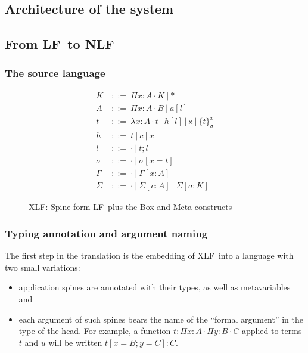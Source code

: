 \documentclass[preprint]{sigplanconf}
\newcommand\gor{\ |\ }
\newcommand\gequal{\ ::=\ }
\newcommand\meta[1]{\textsf{#1}}
\newcommand\mv{x}
\newcommand\mmv{y}
\newcommand\mmeta{\meta x}
\newcommand\mco{c}
\newcommand\mcf{a}
\newcommand\postbinder{\cdot}
\newcommand\prd[2]{\Pi{#1}:{#2}\postbinder}
\newcommand\tlam[2]{\lambda{#1}:{#2}\postbinder}
\newcommand\lam{\tlam}
\newcommand\obox[3]{\{{#1}\}^{#2}_{#3}}
\newcommand\srt[1]{\mathsf{#1}}
\newcommand\type{\srt *}
\newcommand\lapp[2]{{#1}[{#2}]}
\newcommand\laapp[3]{{#1}[{#2}]:{#3}}
\newcommand\lnil{\cdot}
\newcommand\lcons[2]{{#1};{#2}}
\newcommand\lncons[3]{{#1}={#2};{#3}}
\newcommand\lnsing[2]{{#1}={#2}}
\newcommand\enil\cdot
\newcommand\eent[1]{[{#1}]}
\newcommand\econs[2]{{#1}\eent{#2}}
\newcommand\ebinddecl[3]{\econs{#1}{{#2}:{#3}}}
\newcommand\snil\enil
\newcommand\sent[2]{[{#1}={#2}]}
\newcommand\scons[3]{{#1}\sent{#2}{#3}}
\newcommand\lang[1]{\textsf{#1}}
\newcommand\LF{\lang{LF}}
\newcommand\XLF{\lang{XLF}}
\newcommand\NLF{\lang{NLF}}
\newcommand\XLFmod[1]{#1}
\def\inXLF{\def\thelangmod{\XLFmod}}
\newcommand\mk{\thelangmod{K}}
\newcommand\mf{\thelangmod{A}}
\newcommand\mmf{\thelangmod{B}}
\newcommand\mmmf{\thelangmod{C}}
\newcommand\mo{\thelangmod{t}}
\newcommand\mmo{\thelangmod{u}}
\newcommand\mh{\thelangmod{h}}
\newcommand\ma{\thelangmod{l}}
\newcommand\ms{\thelangmod{\sigma}}
\newcommand\me{\thelangmod{\Gamma}}
\newcommand\msi{\thelangmod{\Sigma}}
\begin{document}

\subsection{Architecture of the system}

\subsection{From \LF\ to \NLF}

\subsubsection{The source language}

\begin{figure}
  \inXLF
  \begin{align*}
    \mk &\gequal { \prd\mv\mf\mk \gor \type } \\
    \mf &\gequal { \prd\mv\mf\mmf \gor \lapp\mcf\ma } \\
    \mo &\gequal { \lam\mv\mf\mo \gor \lapp\mh\ma \gor \mmeta \gor \obox\mo\mv\ms } \\
    \mh &\gequal { \mo \gor \mco \gor \mv } \\
    \ma &\gequal { \lnil \gor \lcons\mo\ma } \\
    \ms &\gequal { \snil \gor \scons \sigma\mv\mo } \\[0.5em]
    \me &\gequal { \enil \gor \ebinddecl \Gamma\mv\mf } \\
    \msi &\gequal { \enil \gor \ebinddecl\msi\mco\mf \gor
      \ebinddecl\msi\mcf\mk }
  \end{align*}
  \caption{\XLF: Spine-form \LF\ plus the \textsf{Box} and \textsf{Meta} constructs}
\end{figure}

\subsubsection{Typing annotation and argument naming}

The first step in the translation is the embedding of \XLF\ into a
language with two small variations:
\begin{itemize}
\item application spines are annotated with their types, as well as
  metavariables and
\item \inXLF each argument of such spines bears the name of the ``formal
  argument'' in the type of the head. For example, a function $\mo :
  \prd\mv\mf\prd\mmv\mmf\mmmf$ applied to terms $\mo$ and $\mmo$ will be written
  $\laapp{\mo}{\lncons \mv \mmf {\lnsing\mmv\mmmf}} C$.
\end{itemize}
\end{document}
